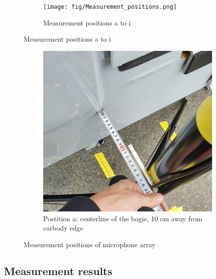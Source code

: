 \begin{figure}[H]
     \centering
     \begin{subfigure}[b]{\textwidth}
         \centering
         \texttt{[image: fig/Measurement\_positions.png]}
         \caption{Measurement positions a to i}
     \end{subfigure}
\end{figure}

\begin{figure}[H]\ContinuedFloat
    \centering
    \begin{subfigure}[b]{0.6\textwidth}
         \centering
         \includegraphics[width=\linewidth]{fig/position_of_microphones.jpg}
         \caption{Postition a: centerline of the bogie, 10 cm away from carbody edge}
         \label{fig:position_a}
     \end{subfigure}
     \caption{Measurement positions of microphone array}
     \label{fig:microphoneposition}
\end{figure}

\subsection*{Measurement results}

